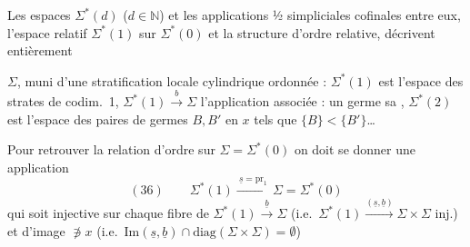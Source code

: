 \documentclass[11pt,a4paper]{article}
\begin{document}
\struck{\ill{}} Les espaces $\Sigma^{*}(d)$ ($d\in\mathbb{N}$) et les applications ½ simpliciales cofinales entre eux, \struck{\ill{}}  l'espace relatif $\Sigma^{*}(1)$ sur $\Sigma^{*}(0)$ et la structure d'ordre relative,  décrivent entièrement


\struck{\ill{}} $\Sigma$, muni d'une stratification locale cylindrique ordonnée : $\Sigma^{*}(1)$ est l'espace des strates de codim.\ 1, $\Sigma^{*}(1)\xrightarrow{\ b\ }\Sigma$ l'application associée : un germe sa , $\Sigma^{*}(2)$ est l'espace des paires de germes $B,B'$ en $x$ \struck{\ill{}} tels que $\lbrace B\rbrace<\lbrace B'\rbrace$\ldots



Pour retrouver la relation d'ordre sur $\Sigma=\Sigma^{*}(0)$  \struck{\ill{}} on doit se donner une application \struck{\ill{}} 
\[
(36)\qquad \Sigma^{*}(1)\xrightarrow{\ \underline s=\mathrm{pr}_1\ }\Sigma=\Sigma^{*}(0)
\]
qui soit injective  sur chaque fibre  de $\Sigma^{*}(1)\xrightarrow{\ \underline b\ }\Sigma$ (i.e.\ $\Sigma^{*}(1)\xrightarrow{(\underline s,\underline b)}\Sigma\times\Sigma$ inj.) et d'image $\not\ni x$ (i.e.\ $\mathrm{Im}(\underline s,\underline b)\cap\mathrm{diag}(\Sigma\times\Sigma)=\emptyset$)
\end{document}
